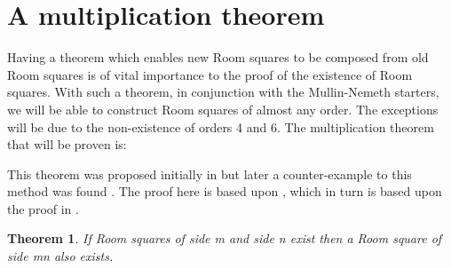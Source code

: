 \documentclass[
  11pt,
  a4paper]{book}
\newtheorem{theorem}{Theorem}
\newcounter{example}
\begin{document}
\hypertarget{a-multiplication-theorem}{%
\section{A multiplication theorem}\label{a-multiplication-theorem}}

Having a theorem which enables new Room squares to be composed from old
Room squares is of vital importance to the proof of the existence of
Room squares. With such a theorem, in conjunction with the Mullin-Nemeth
starters, we will be able to construct Room squares of almost any order.
The exceptions will be due to the non-existence of orders 4 and 6. The
multiplication theorem that will be proven is:

This theorem was proposed initially in \textcite{bruck_what_1963} but
later a counter-example to this method was found
\textcite{mullin_counterexample_1969}. The proof here is based upon
\textcite{anderson_combinatorial_1990}, which in turn is based upon the
proof in \textcite{stanton_multiplication_1972}.

\begin{theorem}
\label{thm:multiply}
If Room squares of side m and side n exist then a Room
square of side mn also exists.
\end{theorem}
\end{document}

